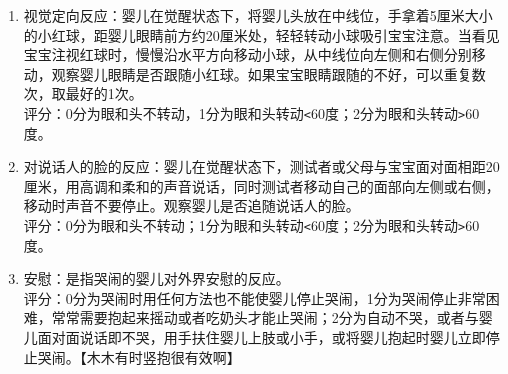 \begin{enumerate}
\item
  视觉定向反应：婴儿在觉醒状态下，将婴儿头放在中线位，手拿着5厘米大小的小红球，距婴儿眼睛前方约20厘米处，轻轻转动小球吸引宝宝注意。当看见宝宝注视红球时，慢慢沿水平方向移动小球，从中线位向左侧和右侧分别移动，观察婴儿眼睛是否跟随小红球。如果宝宝眼睛跟随的不好，可以重复数次，取最好的1次。\\
  评分：0分为眼和头不转动，1分为眼和头转动\texttt{\textless{}}\hspace{0pt}60度；2分为眼和头转动\texttt{\textgreater{}}\hspace{0pt}60度。
\item
  对说话人的脸的反应：婴儿在觉醒状态下，测试者或父母与宝宝面对面相距20厘米，用高调和柔和的声音说话，同时测试者移动自己的面部向左侧或右侧，移动时声音不要停止。观察婴儿是否追随说话人的脸。\\
  评分：0分为眼和头不转动；1分为眼和头转动\texttt{\textless{}}\hspace{0pt}60度；2分为眼和头转动\texttt{\textgreater{}}\hspace{0pt}60度。
\item
  安慰：是指哭闹的婴儿对外界安慰的反应。\\
  评分：0分为哭闹时用任何方法也不能使婴儿停止哭闹，1分为哭闹停止非常困难，常常需要抱起来摇动或者吃奶头才能止哭闹；2分为自动不哭，或者与婴儿面对面说话即不哭，用手扶住婴儿上肢或小手，或将婴儿抱起时婴儿立即停止哭闹。【木木有时竖抱很有效啊】
\end{enumerate}

